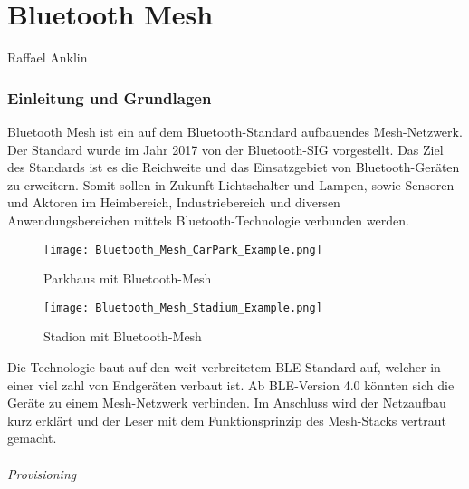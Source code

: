\vspace*{4cm}
\part{Bluetooth Mesh}\label{part:BluetoothMesh}
Raffael Anklin
\vspace*{\fill}
\clearpage

\section{Einleitung und Grundlagen}\label{sec:EinleitungBluetooth}


Bluetooth Mesh ist ein auf dem Bluetooth-Standard aufbauendes Mesh-Netzwerk. Der Standard wurde im Jahr 2017 von der Bluetooth-SIG vorgestellt. Das Ziel des Standards ist es die Reichweite und das Einsatzgebiet von Bluetooth-Geräten zu erweitern. Somit sollen in Zukunft Lichtschalter und Lampen, sowie Sensoren und Aktoren im Heimbereich, Industriebereich und diversen Anwendungsbereichen mittels Bluetooth-Technologie verbunden werden.  \\

\begin{figure}[!htbp]
	\begin{minipage}{0.49\textwidth}
		\centering
		\texttt{[image: Bluetooth\_Mesh\_CarPark\_Example.png]}
		\caption[Parkhaus mit Bluetooth-Mesh]{Parkhaus mit Bluetooth-Mesh \cite{bluetooth_sig_mesh-technology-overviewpdf_2020}}
		\label{fig:BluetoothMeshParkingExample}
	\end{minipage}
	\begin{minipage}{0.49\textwidth}
		\centering
		\texttt{[image: Bluetooth\_Mesh\_Stadium\_Example.png]}
		\caption[Stadion mit Bluetooth-Mesh]{Stadion mit Bluetooth-Mesh \cite{bluetooth_sig_mesh-technology-overviewpdf_2020}}
		\label{fig:BluetoothMeshStadiumExample}
	\end{minipage}
\end{figure}


Die Technologie baut auf den weit verbreitetem BLE-Standard auf, welcher in einer viel zahl von Endgeräten verbaut ist. Ab BLE-Version 4.0 könnten sich die Geräte zu einem Mesh-Netzwerk verbinden. Im Anschluss wird der Netzaufbau kurz erklärt und der Leser mit dem Funktionsprinzip des Mesh-Stacks vertraut gemacht.

\paragraph{Provisioning}

